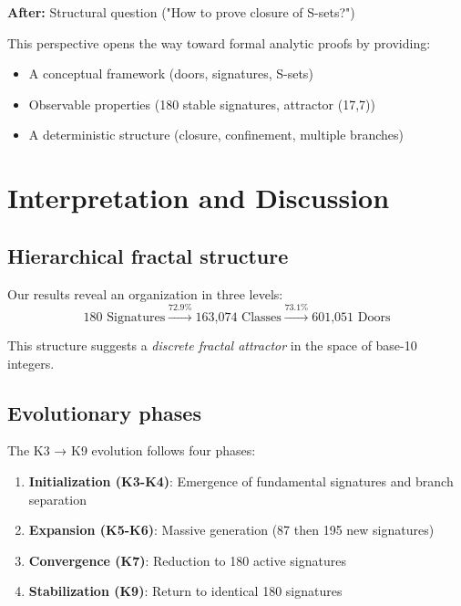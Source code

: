 \documentclass[12pt,a4paper]{article}
\theoremstyle{remark}
\begin{document}
\textbf{After:} Structural question ("How to prove closure of S-sets?")

This perspective opens the way toward formal analytic proofs by providing:
\begin{itemize}
\item A conceptual framework (doors, signatures, S-sets)
\item Observable properties (180 stable signatures, attractor (17,7))
\item A deterministic structure (closure, confinement, multiple branches)
\end{itemize}


\section{Interpretation and Discussion}
\label{sec:interpretation_en}

\subsection{Hierarchical fractal structure}

Our results reveal an organization in three levels:
\[
\text{180 Signatures} \xrightarrow{72.9\%} \text{163,074 Classes} \xrightarrow{73.1\%} \text{601,051 Doors}
\]

This structure suggests a \textit{discrete fractal attractor} in the space of base-10 integers.

\subsection{Evolutionary phases}

The K3 → K9 evolution follows four phases:

\begin{enumerate}
\item \textbf{Initialization (K3-K4)}: Emergence of fundamental signatures and branch separation
\item \textbf{Expansion (K5-K6)}: Massive generation (87 then 195 new signatures)
\item \textbf{Convergence (K7)}: Reduction to 180 active signatures
\item \textbf{Stabilization (K9)}: Return to identical 180 signatures
\end{enumerate}
\end{document}
